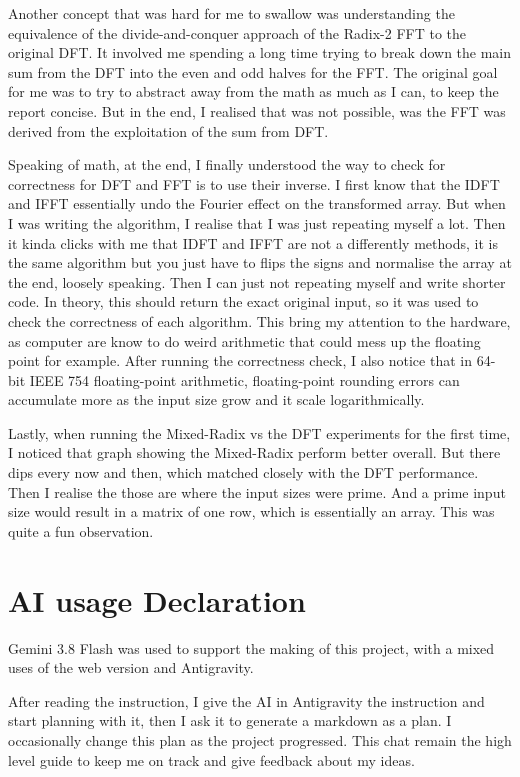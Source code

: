 \documentclass{article}
\begin{document}
Another concept that was hard for me to swallow was understanding the equivalence of the divide-and-conquer approach of the Radix-2 FFT to the original DFT. It involved me spending a long time trying to break down the main sum from the DFT into the even and odd halves for the FFT. The original goal for me was to try to abstract away from the math as much as I can, to keep the report concise. But in the end, I realised that was not possible, was the FFT was derived from the exploitation of the sum from DFT.

Speaking of math, at the end, I finally understood the way to check for correctness for DFT and FFT is to use their inverse. I first know that the IDFT and IFFT essentially undo the Fourier effect on the transformed array. But when I was writing the algorithm, I realise that I was just repeating myself a lot. Then it kinda clicks with me that IDFT and IFFT are not a differently methods, it is the same algorithm but you just have to flips the signs and normalise the array at the end, loosely speaking. Then I can just not repeating myself and write shorter code. In theory, this should return the exact original input, so it was used to check the correctness of each algorithm. This bring my attention to the hardware, as computer are know to do weird arithmetic that could mess up the floating point for example. After running the correctness check, I also notice that in 64-bit IEEE 754 floating-point arithmetic, floating-point rounding errors can accumulate more as the input size grow and it scale logarithmically. 

Lastly, when running the Mixed-Radix vs the DFT experiments for the first time, I noticed that graph showing the Mixed-Radix perform better overall. But there dips every now and then, which matched closely with the DFT performance. Then I realise the those are where the input sizes were prime. And a prime input size would result in a matrix of one row, which is essentially an array. This was quite a fun observation. 

\section{AI usage Declaration}
Gemini 3.8 Flash was used to support the making of this project, with a mixed uses of the web version and Antigravity. 

After reading the instruction, I give the AI in Antigravity the instruction and start planning with it, then I ask it to generate a markdown as a plan. I occasionally change this plan as the project progressed. This chat remain the high level guide to keep me on track and give feedback about my ideas. 
\end{document}
